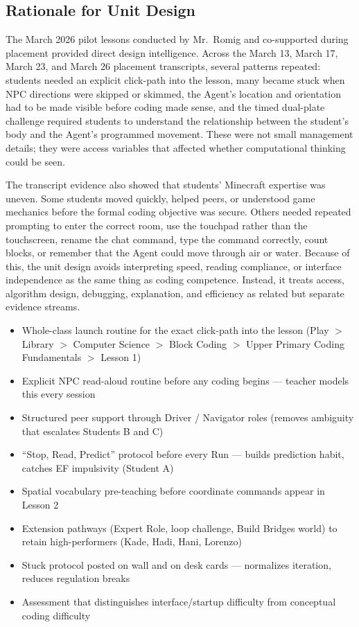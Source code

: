 \documentclass[12pt]{article}
\begin{document}
\subsection{Rationale for Unit Design}

The March 2026 pilot lessons conducted by Mr.\ Romig and co-supported during placement provided direct design intelligence. Across the March 13, March 17, March 23, and March 26 placement transcripts, several patterns repeated: students needed an explicit click-path into the lesson, many became stuck when NPC directions were skipped or skimmed, the Agent's location and orientation had to be made visible before coding made sense, and the timed dual-plate challenge required students to understand the relationship between the student's body and the Agent's programmed movement. These were not small management details; they were access variables that affected whether computational thinking could be seen.

\newpage
The transcript evidence also showed that students' Minecraft expertise was uneven. Some students moved quickly, helped peers, or understood game mechanics before the formal coding objective was secure. Others needed repeated prompting to enter the correct room, use the touchpad rather than the touchscreen, rename the chat command, type the command correctly, count blocks, or remember that the Agent could move through air or water. Because of this, the unit design avoids interpreting speed, reading compliance, or interface independence as the same thing as coding competence. Instead, it treats access, algorithm design, debugging, explanation, and efficiency as related but separate evidence streams.

\begin{keybox}
\begin{itemize}
\item Whole-class launch routine for the exact click-path into the lesson (Play $>$ Library $>$ Computer Science $>$ Block Coding $>$ Upper Primary Coding Fundamentals $>$ Lesson 1)
\item Explicit NPC read-aloud routine before any coding begins --- teacher models this every session
\item Structured peer support through Driver / Navigator roles (removes ambiguity that escalates Students B and C)
\item ``Stop, Read, Predict'' protocol before every Run --- builds prediction habit, catches EF impulsivity (Student A)
\item Spatial vocabulary pre-teaching before coordinate commands appear in Lesson 2
\item Extension pathways (Expert Role, loop challenge, Build Bridges world) to retain high-performers (Kade, Hadi, Hani, Lorenzo)
\item Stuck protocol posted on wall and on desk cards --- normalizes iteration, reduces regulation breaks
\item Assessment that distinguishes interface/startup difficulty from conceptual coding difficulty
\end{itemize}
\end{keybox}
\end{document}
